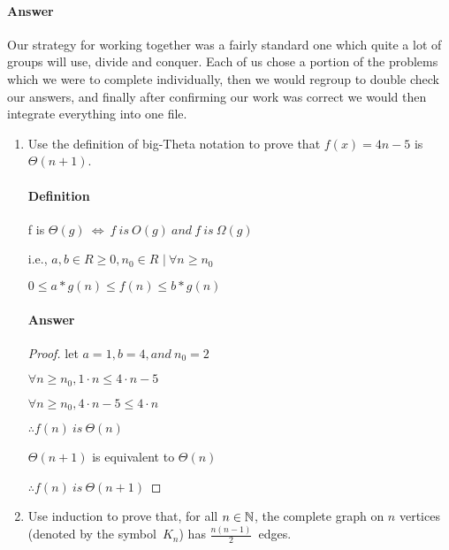 \documentclass{article}
\begin{document}
\paragraph{Answer}

Our strategy for working together was a fairly standard one which quite a lot of groups will use, divide and conquer. Each of us chose a portion of the problems which we were to complete individually, then we would regroup to double check our answers, and finally after confirming our work was correct we would then integrate everything into one file.



\begin{enumerate}

	\item Use the definition of big-Theta notation to prove that $f(x)=4n-5$
	      is $\Theta(n+1)$.

	      \paragraph{Definition}
	      f is $\Theta(g)\ \iff\ f\ is\ O(g)\ and\ f\ is\ \Omega(g)$

	      i.e., $ a, b \in R \geq 0, n_{0} \in R$
	      $|\ \forall n \geq n_0$

	      $0 \leq a* g(n) \leq f(n) \leq b*g(n)$

	      \paragraph{Answer}
	      \begin{proof}
		      let $a = 1, b = 4, and\ n_0 = 2$

		      $\forall n \geq n_0, 1 \cdot n \leq 4 \cdot n - 5$

		      $\forall n \geq n_0, 4 \cdot n - 5 \leq 4 \cdot n$

		      $\therefore f(n)\ is\ \Theta(n)$

		      $\Theta(n+1)$ is equivalent to $\Theta(n)$

		      $\therefore f(n)\ is\ \Theta(n+1)$
	      \end{proof}

	\item Use induction to prove that, for all $n \in {\mathbb N}$, the complete graph on
	      $n$ vertices (denoted by the symbol~$K_n$) has $\frac{n(n-1)}{2}$~edges.


\end{enumerate}
\end{document}
